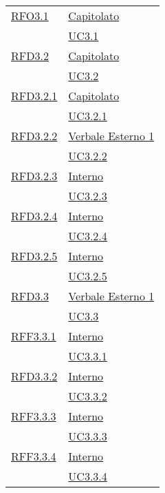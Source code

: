 \begin{longtable}{|>{\centering}m{5cm}|m{5cm}<{\centering}|}
\hyperlink{RFO3.1}{RFO3.1} & \hyperlink{Capitolato}{Capitolato}\\
& \hyperref[UC3.1]{UC3.1}\\ \hline

\hyperlink{RFD3.2}{RFD3.2} & \hyperlink{Capitolato}{Capitolato}\\
& \hyperref[UC3.2]{UC3.2}\\ \hline

\hyperlink{RFD3.2.1}{RFD3.2.1} & \hyperlink{Capitolato}{Capitolato}\\
& \hyperref[UC3.2.1]{UC3.2.1}\\ \hline

\hyperlink{RFD3.2.2}{RFD3.2.2} & \hyperlink{Verbale Esterno 1}{Verbale Esterno 1}\\
& \hyperref[UC3.2.2]{UC3.2.2}\\ \hline

\hyperlink{RFD3.2.3}{RFD3.2.3} & \hyperlink{Interno}{Interno}\\
& \hyperref[UC3.2.3]{UC3.2.3}\\ \hline

\hyperlink{RFD3.2.4}{RFD3.2.4} & \hyperlink{Interno}{Interno}\\
& \hyperref[UC3.2.4]{UC3.2.4}\\ \hline

\hyperlink{RFD3.2.5}{RFD3.2.5} & \hyperlink{Interno}{Interno}\\
& \hyperref[UC3.2.5]{UC3.2.5}\\ \hline

\hyperlink{RFD3.3}{RFD3.3} & \hyperlink{Verbale Esterno 1}{Verbale Esterno 1}\\
& \hyperref[UC3.3]{UC3.3}\\ \hline

\hyperlink{RFF3.3.1}{RFF3.3.1} & \hyperlink{Interno}{Interno}\\
& \hyperref[UC3.3.1]{UC3.3.1}\\ \hline

\hyperlink{RFD3.3.2}{RFD3.3.2} & \hyperlink{Interno}{Interno}\\
& \hyperref[UC3.3.2]{UC3.3.2}\\ \hline

\hyperlink{RFF3.3.3}{RFF3.3.3} & \hyperlink{Interno}{Interno}\\
& \hyperref[UC3.3.3]{UC3.3.3}\\ \hline

\hyperlink{RFF3.3.4}{RFF3.3.4} & \hyperlink{Interno}{Interno}\\
& \hyperref[UC3.3.4]{UC3.3.4}\\ \hline


\end{longtable}
